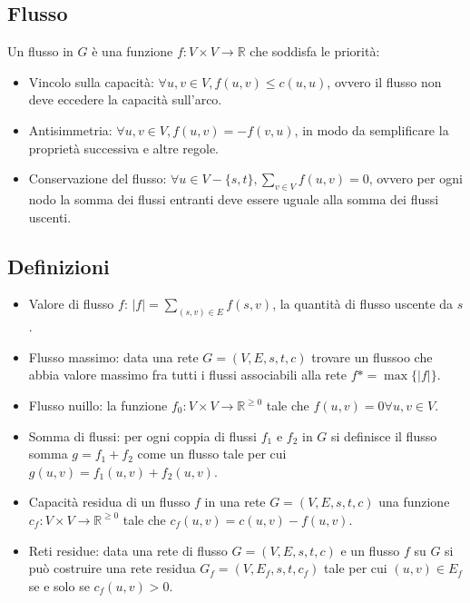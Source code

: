 \subsection{Flusso}
Un flusso in $G$ \`e una funzione $f:V\times V\rightarrow\mathbb{R}$ che soddisfa le priorit\`a:
\begin{itemize}
	\item Vincolo sulla capacit\`a: $\forall u, v\in V, f(u, v)\le c(u, u)$, ovvero il flusso non deve eccedere la capacit\`a sull'arco.
	\item Antisimmetria: $\forall u, v\in V, f(u, v) = -f(v, u)$, in modo da semplificare la propriet\`a successiva e altre regole.
	\item Conservazione del flusso: $\forall u\in V - \{s, t\}, \sum\limits_{v\in V} f(u, v) = 0$, ovvero per ogni nodo la somma dei flussi entranti deve essere uguale alla somma dei
		flussi uscenti. 
\end{itemize}
\subsection{Definizioni}
\begin{itemize}
	\item Valore di flusso $f$: $|f| = \sum\limits_{(s, v)\in E} f(s, v)$, la quantit\`a di flusso uscente da $s$.
	\item Flusso massimo: data una rete $G=(V, E, s, t, c)$ trovare un flussoo che abbia valore massimo fra tutti i flussi associabili alla rete $f*=\max\{|f|\}$.
	\item Flusso nuillo: la funzione $f_0: V\times V\rightarrow\mathbb{R}^{\ge 0}$ tale che $f(u, v) = 0 \forall u, v\in V$.
	\item Somma di flussi: per ogni coppia di flussi $f_1$ e $f_2$ in $G$ si definisce il flusso somma $g= f_1+f_2$ come un flusso tale per cui $g(u, v) = f_1(u, v)+f_2(u, v)$.
	\item Capacit\`a residua di un flusso $f$ in una rete $G=(V, E, s, t, c)$ una funzione $c_f:V\times V\rightarrow\mathbb{R}^{\ge 0}$ tale che $c_f(u, v) = c(u, v)-f(u, v)$.
	\item Reti residue: data una rete di flusso $G=(V, E, s, t, c)$ e un flusso $f$ su $G$ si pu\`o costruire una rete residua $G_f=(V, E_f, s, t, c_f)$ tale per cui $(u, v)\in E_f$
		se e solo se $c_f(u, v)>0$.
\end{itemize}
